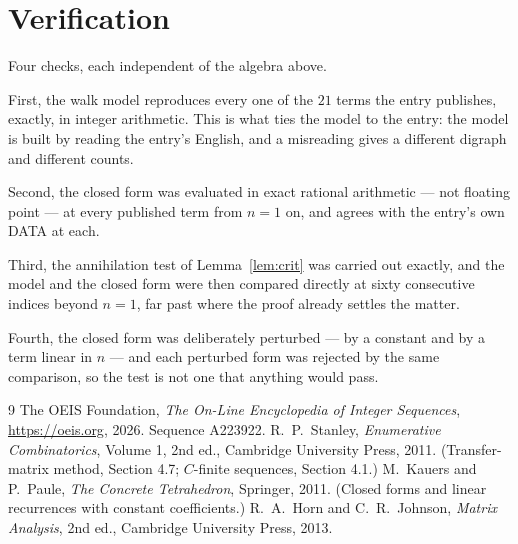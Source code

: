 \documentclass[11pt,a4paper]{article}
\theoremstyle{plain}
\theoremstyle{definition}
\begin{document}
\section{Verification}

Four checks, each independent of the algebra above.

First, the walk model reproduces every one of the $21$ terms the entry publishes,
exactly, in integer arithmetic. This is what ties the model to the entry: the model is built
by reading the entry's English, and a misreading gives a different digraph and different
counts.

Second, the closed form was evaluated in exact rational arithmetic --- not floating point ---
at every published term from $n=1$ on, and agrees with the entry's own DATA at each.

Third, the annihilation test of Lemma~\ref{lem:crit} was carried out exactly, and the model
and the closed form were then compared directly at sixty consecutive indices beyond
$n=1$, far past where the proof already settles the matter.

Fourth, the closed form was deliberately perturbed --- by a constant and by a term linear in
$n$ --- and each perturbed form was rejected by the same comparison, so the test is not one
that anything would pass.

\begin{thebibliography}{9}
 The OEIS Foundation, \emph{The On-Line Encyclopedia of Integer
Sequences}, \url{https://oeis.org}, 2026. Sequence A223922.
 R.~P.~Stanley, \emph{Enumerative Combinatorics}, Volume 1, 2nd ed.,
Cambridge University Press, 2011. (Transfer-matrix method, Section 4.7; $C$-finite sequences,
Section 4.1.)
 M.~Kauers and P.~Paule, \emph{The Concrete Tetrahedron}, Springer, 2011.
(Closed forms and linear recurrences with constant coefficients.)
 R.~A.~Horn and C.~R.~Johnson, \emph{Matrix Analysis}, 2nd ed., Cambridge
University Press, 2013.
\end{thebibliography}
\end{document}
